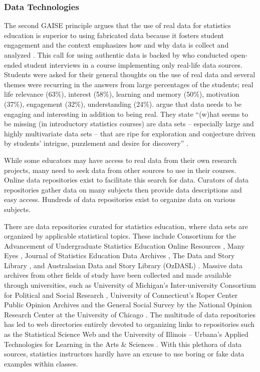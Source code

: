 \subsubsection{Data Technologies} 
\label{DataTech} 

The second GAISE principle argues that the use of real data for statistics education is superior to using fabricated data because it fosters student engagement  and the context emphasizes how and why data is collect and analyzed \citep{GAISEcollege}. This call for using authentic data is backed by \citet{Neumann2013} who conducted open-ended student interviews in a course implementing only real-life data sources. Students were asked for their general thoughts on the use of real data and several themes were recurring in the answers from large percentages of the students; real life relevance (63\%), interest (58\%), learning and memory (50\%), motivation (37\%), engagement (32\%), understanding (24\%). \citet{Finzer2007} argue that data needs to be engaging and interesting in addition to being real.  They state ``(w)hat seems to be missing (in introductory statistics courses) are data sets -- especially large and highly multivariate data sets -- that are ripe for exploration and conjecture driven by students' intrigue, puzzlement and desire for discovery'' \citep[p.1]{Finzer2007}.  

While some educators may have access to real data from their own research projects, many need to seek data from other sources to use in their courses. Online data repositories exist to facilitate this search for data. Curators of data repositories gather data on many subjects then provide data descriptions and easy access. Hundreds of data repositories exist to organize data on various subjects. 

There are data repositories curated for statistics education, where data sets are organized by applicable statistical topics. These include Consortium for the Advancement of Undergraduate Statistics Education Online Resources \citep{CAUSErepo}, Many Eyes \citep{ManyEyes}, Journal of Statistics Education Data Archives \citep{JSErepo}, The Data and Story Library \citep{DASL}, and Australasian Data and Story Library (OzDASL) \citep{OzDASL}. Massive data archives from other fields of study have been collected and made available through universities, such as University of Michigan's Inter-university Consortium for Political and Social Research \citep{ICPSR}, University of Connecticut's Roper Center Public Opinion Archives \citep{Roper} and the General Social Survey by the National Opinion Research Center at the University of Chicago \citep{GSS}. The multitude of data repositories has led to web directories entirely devoted to organizing links to repositories such as the Statistical Science Web \citep{SSW} and the University of Illinois -- Urbana's Applied Technologies for Learning in the Arts \& Sciences \citep{ATLAS}.  With this plethora of data sources, statistics instructors hardly have an excuse to use boring or fake data examples within classes. 

